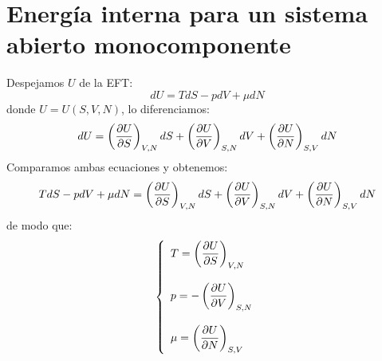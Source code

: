 \documentclass[../main]{subfiles}
\begin{document}
\section{Energía interna para un sistema abierto monocomponente}
Despejamos $U$ de la EFT:
\begin{equation}
    dU=TdS-pdV+\mu dN
\end{equation}
donde $U=U(S,V,N)$, lo diferenciamos:
\begin{equation}
    dU=\left( \pdv{U}{S} \right)_{V,N}dS+\left(\pdv{U}{V}\right)_{S,N}dV+\left( \pdv{U}{N}\right)_{S,V}dN
\end{equation}
Comparamos ambas ecuaciones y obtenemos:
\begin{equation}
    TdS-pdV+\mu dN=\left( \pdv{U}{S} \right)_{V,N}dS+\left(\pdv{U}{V}\right)_{S,N}dV+\left( \pdv{U}{N}\right)_{S,V}dN
\end{equation}
de modo que:
\begin{equation}
    \left\{ 
    \begin{array}{l}
         T=\displaystyle \left( \pdv{U}{S} \right)_{V,N} \\ \\
         p=-\displaystyle \left(\pdv{U}{V}\right)_{S,N} \\ \\
         \mu=\displaystyle \left( \pdv{U}{N}\right)_{S,V}
    \end{array} 
    \right. 
\end{equation}
\end{document}
